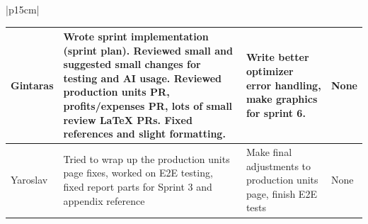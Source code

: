 \begin{table}[H]
    \centering
    \begin{tabular}{|p{15cm}|} 
        \hline
        \begin{table}[H]
            \begin{tabular}{|p{1.75cm}|p{4cm}|p{4cm}|p{4cm}|}
                \hline
                \cellcolor[HTML]{d4d4d4} Gintaras & Wrote sprint implementation (sprint plan). Reviewed small and suggested small changes for testing and AI usage. Reviewed production units PR, profits/expenses PR, lots of small review LaTeX PRs. Fixed references and slight formatting. & Write better optimizer error handling, make graphics for sprint 6. & None \\
                \hline
                \cellcolor[HTML]{d4d4d4} Yaroslav & Tried to wrap up the production units page fixes, worked on E2E testing, fixed report parts for Sprint 3 and appendix reference & Make final adjustments to production units page, finish E2E tests & None \\
                \hline
            \end{tabular}
        \end{table}
        \\
        \hline
    \end{tabular}
\end{table}

